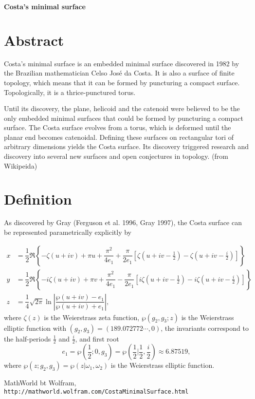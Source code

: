 \documentclass[12pt,dvipdfmx]{article}
\begin{document}
\begin{center}

{\bf \Large Costa's minimal surface}

\end{center}


\section{Abstract}

Costa's minimal surface is an embedded minimal surface discovered in 1982 by the Brazilian mathematician Celso Jos\'e da Costa. It is also a surface of finite topology, which means that it can be formed by puncturing a compact surface. Topologically, it is a thrice-punctured torus.

Until its discovery, the plane, helicoid and the catenoid were believed to be the only embedded minimal surfaces that could be formed by puncturing a compact surface. The Costa surface evolves from a torus, which is deformed until the planar end becomes catenoidal. Defining these surfaces on rectangular tori of arbitrary dimensions yields the Costa surface. Its discovery triggered research and discovery into several new surfaces and open conjectures in topology. (from Wikipeida)



\section{Definition}

As discovered by Gray (Ferguson et al. 1996, Gray 1997), the Costa surface can be represented parametrically explicitly by

\begin{align*}
x	&=	\dfrac{1}{2}\Re\left\{-\zeta(u+iv)+\pi u+\dfrac{\pi^2}{4e_1}+\dfrac{\pi}{2e_1}[\zeta(u+iv-\frac{1}{2})-\zeta(u+iv-\frac{i}{2})]\right\} \\	
y	&=	\dfrac{1}{2}\Re\left\{-i\zeta(u+iv)+\pi v+\dfrac{\pi^2}{4e_1}-\dfrac{\pi}{2e_1}[i\zeta(u+iv-\frac{1}{2})-i \zeta(u+iv-\frac{i}{2})]\right \} \\	
z	&=	\dfrac{1}{4}\sqrt{2\pi} \ln \left|\dfrac{\wp(u+iv)-e_1}{\wp(u+iv)+e_1}\right|,	
\end{align*}
where $\zeta(z)$ is the Weierstrass zeta function, $\wp(g_2,g_3;z)$ is the Weierstrass elliptic function with $(g_2,g_3)=(189.072772\cdots, 0)$, the invariants correspond to the half-periods $\frac{1}{2}$ and $\frac{i}{2}$, and first root
\[
 e_1=\wp\left(\frac{1}{2}; 0, g_3\right)=\wp\left(\frac{1}{2} | \frac{1}{2}, \frac{i}{2}\right) \approx 6.87519,
\]
 where $\wp(z;g_2,g_3)=\wp(z|\omega_1,\omega_2)$ is the Weierstrass elliptic function.


\begin{thebibliography}{9}

 MathWorld bt Wolfram, \verb|http://mathworld.wolfram.com/CostaMinimalSurface.html|

\end{thebibliography}
\end{document}
